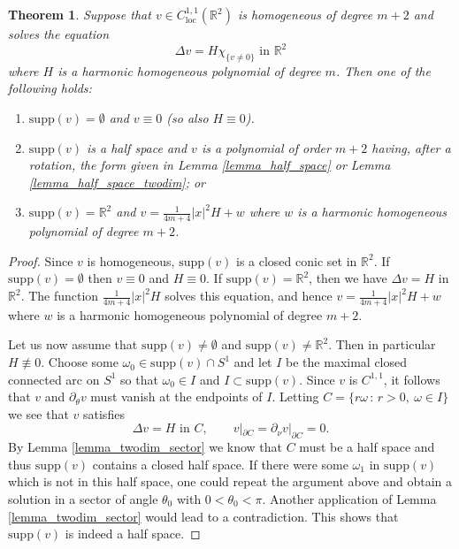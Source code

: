 \documentclass[11pt,a4paper]{amsart}
\newtheorem{Theorem}{Theorem}[section]
\theoremstyle{definition}
\numberwithin{equation}{section}
\newcommand{\mR}{\mathbb{R}}                    %
\newcommand{\abs}[1]{\lvert #1 \rvert}          %
\newcommand{\supp}{\mathrm{supp}}
\newcommand{\p}{\partial}
\begin{document}
\begin{Theorem} \label{thm_blowup_classification}
Suppose that $v \in C^{1,1}_{\mathrm{loc}}(\mR^2)$ is homogeneous of degree $m+2$ and solves the equation 
\[
\Delta v = H \chi_{\{ v \neq 0 \}} \text{ in $\mR^2$}
\]
where $H$ is a harmonic homogeneous polynomial of degree $m$. Then one of the following holds:
\begin{enumerate}
\item[(a)] 
$\supp(v) = \emptyset$ and $v \equiv 0$ (so also $H \equiv 0$).
\item[(b)] 
$\supp(v)$ is a half space and $v$ is a polynomial of order $m+2$ having, after a rotation, the form given in Lemma \ref{lemma_half_space} or Lemma \ref{lemma_half_space_twodim}; or 
\item[(c)]
$\supp(v) = \mR^2$ and $v = \frac{1}{4m+4} \abs{x}^2 H + w$ where $w$ is a harmonic homogeneous polynomial of degree $m+2$.
\end{enumerate}
\end{Theorem}
\begin{proof}
Since $v$ is homogeneous, $\supp(v)$ is a closed conic set in $\mR^2$. If $\supp(v) = \emptyset$ then $v \equiv 0$ and $H \equiv 0$. If $\supp(v) = \mR^2$, then we have $\Delta v = H$ in $\mR^2$. The function $\frac{1}{4m+4} \abs{x}^2 H$ solves this equation, and hence $v = \frac{1}{4m+4} \abs{x}^2 H + w$ where $w$ is a harmonic homogeneous polynomial of degree $m+2$.

Let us now assume that $\supp(v) \neq \emptyset$ and $\supp(v) \neq \mR^2$. Then in particular $H \not\equiv 0$. Choose some $\omega_0 \in \supp(v) \cap S^1$ and let $I$ be the maximal closed connected arc on $S^1$ so that $\omega_0 \in I$ and $I \subset \supp(v)$. Since $v$ is $C^{1,1}$, it follows that $v$ and $\p_{\theta} v$ must vanish at the endpoints of $I$. Letting $C = \{ r \omega \,:\, r > 0, \ \omega \in I \}$ we see that $v$ satisfies 
\[
\Delta v = H \text{ in $C$}, \qquad v|_{\p C} = \p_{\nu} v|_{\p C} = 0.
\]
By Lemma \ref{lemma_twodim_sector} we know that $C$ must be a half space and thus $\supp(v)$ contains a closed half space. If there were some $\omega_1$ in $\supp(v)$ which is not in this half space, one could repeat the argument above and obtain a solution in a sector of angle $\theta_0$ with $0 < \theta_0 < \pi$. Another application of Lemma \ref{lemma_twodim_sector} would lead to a contradiction. This shows that $\supp(v)$ is indeed a half space.
\end{proof}
\end{document}
